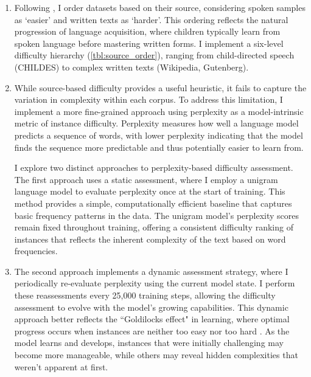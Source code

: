 \begin{enumerate}

\item {} Following \citet{huebner2021babyberta}, I order datasets based on their source, considering spoken samples as `easier' and written texts as `harder'. This ordering reflects the natural progression of language acquisition, where children typically learn from spoken language before mastering written forms. I implement a six-level difficulty hierarchy (\cref{tbl:source_order}), ranging from child-directed speech (CHILDES) to complex written texts (Wikipedia, Gutenberg).

\item {} While source-based difficulty provides a useful heuristic, it fails to capture the variation in complexity within each corpus. To address this limitation, I implement a more fine-grained approach using perplexity as a model-intrinsic metric of instance difficulty. Perplexity measures how well a language model predicts a sequence of words, with lower perplexity indicating that the model finds the sequence more predictable and thus potentially easier to learn from. 

 I explore two distinct approaches to perplexity-based difficulty assessment. The first approach uses a static assessment, where I employ a unigram language model to evaluate perplexity once at the start of training. This method provides a simple, computationally efficient baseline that captures basic frequency patterns in the data. The unigram model's perplexity scores remain fixed throughout training, offering a consistent difficulty ranking of instances that reflects the inherent complexity of the text based on word frequencies.

\item {} The second approach implements a dynamic assessment strategy, where I periodically re-evaluate perplexity using the current model state. I perform these reassessments every 25,000 training steps, allowing the difficulty assessment to evolve with the model's growing capabilities. This dynamic approach better reflects the ``Goldilocks effect" in learning, where optimal progress occurs when instances are neither too easy nor too hard \citep{kidd2012goldilocks}. As the model learns and develops, instances that were initially challenging may become more manageable, while others may reveal hidden complexities that weren't apparent at first.


\end{enumerate}
